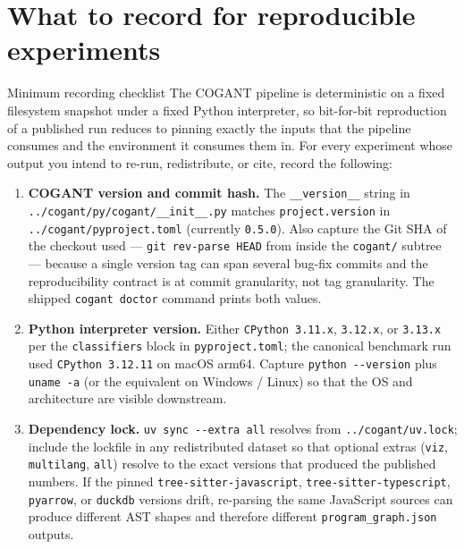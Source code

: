 \documentclass[
  ignorenonframetext,
]{beamer}
\author{\texorpdfstring{}{}}
\date{}
\providecommand{\tightlist}{%
  \setlength{\itemsep}{0pt}\setlength{\parskip}{0pt}}
\begin{document}
\section{What to record for reproducible
experiments}\label{what-to-record-for-reproducible-experiments}

\begin{frame}[fragile]{Minimum recording checklist}
\protect{}\label{minimum-recording-checklist}
The COGANT pipeline is deterministic on a fixed filesystem snapshot
under a fixed Python interpreter, so bit-for-bit reproduction of a
published run reduces to pinning exactly the inputs that the pipeline
consumes and the environment it consumes them in. For every experiment
whose output you intend to re-run, redistribute, or cite, record the
following:

\begin{enumerate}
\tightlist
\item
  \textbf{COGANT version and commit hash.} The \texttt{\_\_version\_\_}
  string in \texttt{../cogant/py/cogant/\_\_init\_\_.py} matches
  \texttt{project.version} in \texttt{../cogant/pyproject.toml}
  (currently \texttt{0.5.0}). Also capture the Git SHA of the checkout
  used --- \texttt{git\ rev-parse\ HEAD} from inside the
  \texttt{cogant/} subtree --- because a single version tag can span
  several bug-fix commits and the reproducibility contract is at commit
  granularity, not tag granularity. The shipped \texttt{cogant\ doctor}
  command prints both values.
\item
  \textbf{Python interpreter version.} Either \texttt{CPython\ 3.11.x},
  \texttt{3.12.x}, or \texttt{3.13.x} per the \texttt{classifiers} block
  in \texttt{pyproject.toml}; the canonical benchmark run used
  \texttt{CPython\ 3.12.11} on macOS arm64. Capture
  \texttt{python\ -\/-version} plus \texttt{uname\ -a} (or the
  equivalent on Windows / Linux) so that the OS and architecture are
  visible downstream.
\item
  \textbf{Dependency lock.} \texttt{uv\ sync\ -\/-extra\ all} resolves
  from \texttt{../cogant/uv.lock}; include the lockfile in any
  redistributed dataset so that optional extras (\texttt{viz},
  \texttt{multilang}, \texttt{all}) resolve to the exact versions that
  produced the published numbers. If the pinned
  \texttt{tree-sitter-javascript}, \texttt{tree-sitter-typescript},
  \texttt{pyarrow}, or \texttt{duckdb} versions drift, re-parsing the
  same JavaScript sources can produce different AST shapes and therefore
  different \texttt{program\_graph.json} outputs.

\end{enumerate}
\end{frame}
\end{document}
